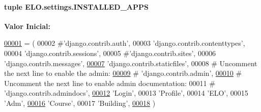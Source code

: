 \hypertarget{namespaceELO_1_1settings_a1a4752075da59d93477195bcc3fc4765}{
\paragraph[{I\-N\-S\-T\-A\-L\-L\-E\-D\-\_\-\-A\-P\-P\-S}]{\setlength{\rightskip}{0pt plus 5cm}tuple E\-L\-O.\-settings.\-I\-N\-S\-T\-A\-L\-L\-E\-D\-\_\-\-A\-P\-P\-S}}\label{namespaceELO_1_1settings_a1a4752075da59d93477195bcc3fc4765}
{\bfseries Valor Inicial\-:}
\begin{DoxyCode}
\hypertarget{namespaceELO_1_1settings_l00001}{}\hyperlink{namespaceELO_1_1settings}{00001} = (
00002     \textcolor{comment}{#'django.contrib.auth',}
00003     \textcolor{stringliteral}{'django.contrib.contenttypes'},
00004     \textcolor{stringliteral}{'django.contrib.sessions'},
00005     \textcolor{comment}{#'django.contrib.sites',}
00006     \textcolor{stringliteral}{'django.contrib.messages'},
\hypertarget{namespaceELO_1_1settings_l00007}{}\hyperlink{namespaceELO_1_1settings_a7730264ddd478343e0f282f36d4a5ab4}{00007}     \textcolor{stringliteral}{'django.contrib.staticfiles'},
00008     \textcolor{comment}{# Uncomment the next line to enable the admin:}
\hypertarget{namespaceELO_1_1settings_l00009}{}\hyperlink{namespaceELO_1_1settings_a62f457ac29cc6f3e85282c71ce3b4f26}{00009}     \textcolor{comment}{# 'django.contrib.admin',}
\hypertarget{namespaceELO_1_1settings_l00010}{}\hyperlink{namespaceELO_1_1settings_a014930e0bf77feccc65c20212593381e}{00010}     \textcolor{comment}{# Uncomment the next line to enable admin documentation:}
00011     \textcolor{comment}{# 'django.contrib.admindocs',}
\hypertarget{namespaceELO_1_1settings_l00012}{}\hyperlink{namespaceELO_1_1settings_a051220bd8105ba13b2720df11c1950ba}{00012}     \textcolor{stringliteral}{'Login'},
00013     \textcolor{stringliteral}{'Profile'},
00014     \textcolor{stringliteral}{'ELO'},
00015     \textcolor{stringliteral}{'Adm'},
\hypertarget{namespaceELO_1_1settings_l00016}{}\hyperlink{namespaceELO_1_1settings_a43e8826e0b24e337065b4975f3eace4c}{00016}     \textcolor{stringliteral}{'Course'},
00017     \textcolor{stringliteral}{'Building'},
\hypertarget{namespaceELO_1_1settings_l00018}{}\hyperlink{namespaceELO_1_1settings_a91ed1425b7f1cf041960832ce5b54b6e}{00018} )
\end{DoxyCode}


